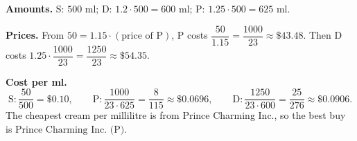 \textbf{Amounts.} S: $500$ ml; D: $1.2\cdot500=600$ ml; P: $1.25\cdot500=625$ ml.

\textbf{Prices.} From $50=1.15\cdot(\text{price of P})$, P costs $\dfrac{50}{1.15}=\dfrac{1000}{23}\approx\$43.48$. Then D costs $1.25\cdot\dfrac{1000}{23}=\dfrac{1250}{23}\approx\$54.35$.

\textbf{Cost per ml.}
\[\text{S}: \dfrac{50}{500}=\$0.10,\qquad \text{P}: \dfrac{1000}{23\cdot625}=\dfrac{8}{115}\approx\$0.0696,\qquad \text{D}: \dfrac{1250}{23\cdot600}=\dfrac{25}{276}\approx\$0.0906.\]
The cheapest cream per millilitre is from Prince Charming Inc., so the best buy is $\boxed{\text{Prince Charming Inc.\ (P)}}$.
